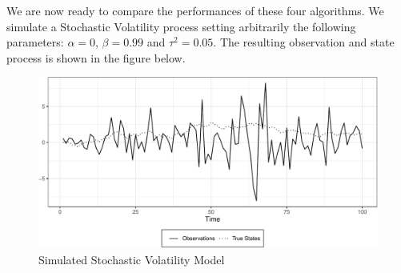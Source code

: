 \documentclass[
]{book}
\theoremstyle{break}
\theoremstyle{nonumberplain}
\begin{document}
We are now ready to compare the performances of these four algorithms.
We simulate a Stochastic Volatility process setting arbitrarily the
following parameters: \(\alpha = 0\), \(\beta = 0.99\) and
\(\tau^{2}=0.05\). The resulting observation and state process is shown
in the figure below.

\begin{figure}[ht]

{\centering \includegraphics{prova_knit_finale_files/figure-latex/unnamed-chunk-32-1} 

}

\caption{Simulated Stochastic Volatility Model}\label{fig:unnamed-chunk-32}
\end{figure}
\end{document}
